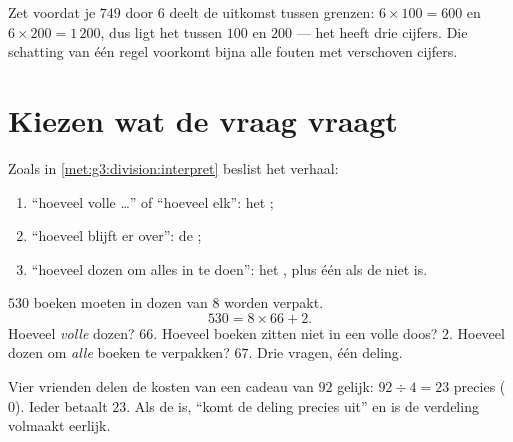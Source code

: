\begin{example}\label{ex:g4:division:size}
Zet voordat je $749$ door $6$ deelt de uitkomst tussen grenzen:
$6 \times 100 = 600$ en $6 \times 200 = 1\,200$, dus ligt het 
tussen $100$ en $200$ --- het heeft drie cijfers. Die schatting van één
regel voorkomt bijna alle fouten met verschoven cijfers.
\end{example}

\section{Kiezen wat de vraag vraagt}

\begin{method}\label{met:g4:division:interpret}
Zoals in \cref{met:g3:division:interpret} beslist het verhaal:
\begin{enumerate}
  \item ``hoeveel volle \dots'' of ``hoeveel elk'': het ;
  \item ``hoeveel blijft er over'': de ;
  \item ``hoeveel dozen om alles in te doen'': het , plus één als
        de  niet  is.
\end{enumerate}
\end{method}

\begin{example}\label{ex:g4:division:problem}
$530$ boeken moeten in dozen van $8$ worden verpakt.
\[
530 = 8 \times 66 + 2 .
\]
Hoeveel \emph{volle} dozen? $66$. Hoeveel boeken zitten niet in een volle
doos? $2$. Hoeveel dozen om \emph{alle} boeken te verpakken? $67$. Drie
vragen, één deling.
\end{example}

\begin{example}\label{ex:g4:division:money}
Vier vrienden delen de kosten van een cadeau van $92$ gelijk:
$92 \div 4 = 23$ precies ( $0$). Ieder betaalt $23$. Als de  
is, ``komt de deling precies uit'' en is de verdeling volmaakt eerlijk.
\end{example}

